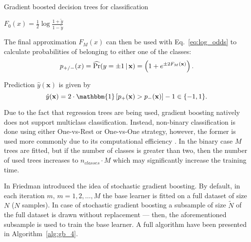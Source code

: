 \documentclass[magisterska, english]{pwr_wmat_praca_dyplomowa}
\theoremstyle{plain}
\numberwithin{theorem}{chapter}
\theoremstyle{definition}
\numberwithin{theorem}{chapter}
\renewcommand{\Pr}{\qopname \relax m{Pr}}
\begin{document}
\begin{algorithm}[H]
\caption{Gradient boosted decision trees for classification}\label{alg:gb_3}
 $\displaystyle F_0(x) = \frac12\log\frac{1+\tilde{y}}{1-\tilde{y}}$\\
\end{algorithm}

The final approximation $F_M(x)$ can then be used with Eq.~\eqref{eq:log_odds} to calculate probabilities of belonging to either one of the classes:
\begin{equation}
    p_{+\mathbin{/}-}(x) = \widehat{\Pr}(y=\pm 1\,|\,\mathbf{x}) = \left(1+e^{\pm 2F_M(\mathbf{x})}\right).
\end{equation}

Prediction $\hat{y}(\mathbf{x})$ is given by
\begin{equation}
   \hat{y}(\mathbf{x}) = 2\cdot \mathbbm{1}\left[p_+(\mathbf{x}) > p_-(\mathbf{x}) \right] - 1 \in \{-1,1\}.
\end{equation}

Due to the fact that regression trees are being used, gradient boosting natively does not support multiclass classification. Instead, non-binary classification is done using either One-vs-Rest or One-vs-One strategy, however, the former is used more commonly due to its computational efficiency \cite{sklearn}. In the binary case $M$ trees are fitted, but if the number of classes is greater than two, then the number of used trees increases to $n_{classes}\cdot M$ which may significantly increase the training time.

In Friedman \cite{friedman_stoch} introduced the idea of stochastic gradient boosting. By default, in each iteration $m,\,m=1,2,\ldots,M$ the base learner is fitted on a full dataset of size $N$ ($N$ samples).
In case of stochastic gradient boosting a subsample of size $\tilde{N}$ of the full dataset is drawn without replacement --- then, the aforementioned subsample is used to train the base learner. A full algorithm have been presented in Algorithm~\ref{alg:gb_4}.
\end{document}
